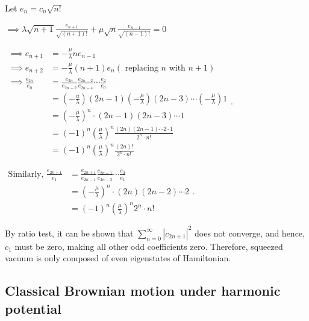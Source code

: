 \documentclass[12pt, twoside]{article}
\begin{document}
Let $e_n = c_n \sqrt{n!}$

$ 
\implies \lambda \sqrt{n+1} \frac{e_{n+1}}{\sqrt{(n+1)!}} + \mu \sqrt{n} \frac{e_{n-1}}{\sqrt{(n-1)!}} = 0$

$\begin{aligned} \implies e_{n+1} &= -\frac{\mu}{\lambda} n e_{n-1} 
\\\implies e_{n+2} &= -\frac{\mu}{\lambda} (n+1) e_n (\text{ replacing $n$ with $n+1$})
\\ \implies \frac { e_{2n} } { e _ { 0 } } &= \frac { e_{2n} } { e_{2n- 2} } \frac { e_{2n- 2} } { e_{2n- 4} } \cdots \frac { e _ { 2 } } { e _ { 0 } } \\ &= \left( - \frac { u } { \lambda } \right) { ( 2n - 1 ) } \left( - \frac { \mu } { \lambda } \right) ( 2n - 3 ) \cdots \left( - \frac { \mu } { \lambda } \right) 1 \\
  &= \left( -\frac { \mu } { \lambda } \right) ^ { n } \cdot ( 2 n - 1 ) ( 2 n - 3 ) \cdots 1 \\  &= ( - 1 ) ^ { n } \left( \frac { \mu } { \lambda } \right) ^ { n } \frac { ( 2 n ) ( 2 n - 1 ) \cdots 2\cdot1 } {2 ^ { n } \cdot n !  } \\ &= ( - 1 ) ^ { n } \left( \frac { \mu } { \lambda } \right) ^ { n } \frac { (2n)! } {2 ^ { n } \cdot n !  }  \end{aligned}$.
  
  $\begin{aligned}\text{Similarly, }\frac { e_{2n+1} } { e _ { 1 } } &= \frac { e_{2n+1} } { e_{2n-1} } \frac { e_{2n- 1} } { e_{2n- 3} } \cdots \frac { e _ { 3 } } { e _ { 1 } } \\
  &= \left( -\frac { \mu } { \lambda } \right) ^ { n } \cdot ( 2 n ) ( 2 n - 2) \cdots 2 \\  &= ( - 1 ) ^ { n } \left( \frac { \mu } { \lambda } \right) ^ { n } {2 ^ { n } \cdot n !  }\end{aligned}$.
  
  By ratio test, it can be shown that $\sum _ { n = 0 } ^ { \infty } |c_{2n+1}|^2$ does not converge, and hence, $c_1$ must be zero, making all other odd coefficients zero. Therefore, squeezed vacuum is only composed of even eigenstates of Hamiltonian.



\subsection{ Classical Brownian motion under harmonic potential}
\end{document}
